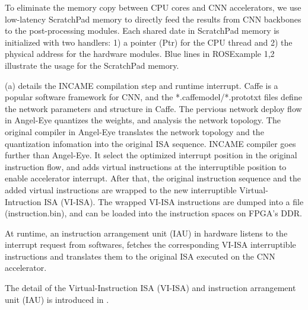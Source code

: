 To eliminate the memory copy between CPU cores and CNN accelerators, we use low-latency ScratchPad memory \cite{Banakar2002Scratchpad} to directly feed the results from CNN backbones to the post-processing modules. Each shared date in ScratchPad memory is initialized with two handlers: 1) a pointer (Ptr) for the CPU thread and 2) the physical address for the hardware modules. Blue lines in  ROSExample 1,2 illustrate the usage for the ScratchPad memory.

(a) details the INCAME compilation step and runtime interrupt. Caffe \cite{jia2014caffe} is a popular software framework for CNN, and the *.caffemodel/*.prototxt files define the network parameters and structure in Caffe. The pervious network deploy flow in Angel-Eye \cite{guo2017angel} quantizes the weights, and analysis the network topology. The original compiler in Angel-Eye translates the network topology and the quantization infomation into the original ISA sequence. INCAME compiler goes further than Angel-Eye. It select the optimized interrupt position in the original instruction flow, and adds virtual instructions at the interruptible position to enable accelerator interrupt. After that, the original instruction sequence and the added virtual instructions are wrapped to the new interruptible Virtual-Intruction ISA (VI-ISA). The wrapped VI-ISA instructions are dumped into a file (instruction.bin), and can be loaded into the instruction spaces on FPGA's DDR.

At runtime, an instruction arrangement unit (IAU) in hardware listens to the interrupt request from softwares, fetches the corresponding VI-ISA interruptible instructions and translates them to the original ISA executed on the CNN accelerator. 

The detail of the Virtual-Instruction ISA (VI-ISA) and instruction arrangement unit (IAU) is introduced in .